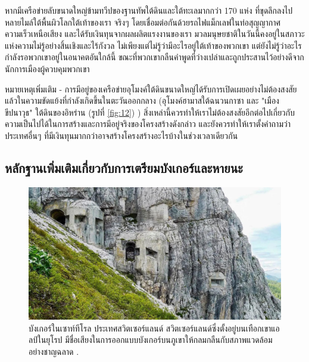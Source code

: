 \documentclass[10pt,twocolumn,letterpaper]{article}
\begin{document}
หากมีเครือข่ายลับขนาดใหญ่ข้ามทวีปของฐานทัพใต้ดินและใต้ทะเลมากกว่า 170 แห่ง ที่ขุดลึกลงไปหลายไมล์ใต้พื้นผิวโลกใต้เท้าของเรา จริงๆ โดยเชื่อมต่อกันด้วยรถไฟแม็กเลฟในท่อสุญญากาศความเร็วเหนือเสียง และได้รับเงินทุนจากผลผลิตแรงงานของเรา มวลมนุษยชาติในวันนี้คงอยู่ในสภาวะแห่งความไม่รู้อย่างสิ้นเชิงและไร้กังวล ไม่เพียงแต่ไม่รู้ว่ามีอะไรอยู่ใต้เท้าของพวกเขา แต่ยังไม่รู้ว่าอะไรกำลังรอพวกเขาอยู่ในอนาคตอันใกล้นี้ ขณะที่พวกเขากลืนคำพูดที่ว่างเปล่าและถูกประสานไว้อย่างดีจากนักการเมืองผู้ควบคุมพวกเขา

หมายเหตุเพิ่มเติม - การมีอยู่ของเครือข่ายอุโมงค์ใต้ดินขนาดใหญ่ได้รับการเปิดเผยอย่างไม่ต้องสงสัยแล้วในความขัดแย้งที่กำลังเกิดขึ้นในตะวันออกกลาง (อุโมงค์ฮามาสใต้ฉนวนกาซา \cite{38} และ "เมืองขีปนาวุธ" ใต้ดินของอิหร่าน (รูปที่ \ref{fig:12}) \cite{39,40}) สิ่งเหล่านี้ควรทำให้เราไม่ต้องสงสัยอีกต่อไปเกี่ยวกับความเป็นไปได้ในการสร้างและการมีอยู่จริงของโครงสร้างดังกล่าว และยังควรทำให้เราตั้งคำถามว่า ประเทศอื่นๆ ที่มีเงินทุนมากกว่าอาจสร้างโครงสร้างอะไรบ้างในช่วงเวลาเดียวกัน
\subsection{หลักฐานเพิ่มเติมเกี่ยวกับการเตรียมบังเกอร์และหายนะ}

\begin{figure}[t]
\begin{center}
   \includegraphics[width=1\linewidth]{tyrol.jpg}
\end{center}
   \caption{บังเกอร์ในเซาท์ทีโรล ประเทศสวิตเซอร์แลนด์ สวิตเซอร์แลนด์ซึ่งตั้งอยู่บนเทือกเขาแอลป์ในยุโรป มีชื่อเสียงในการออกแบบบังเกอร์บนภูเขาให้กลมกลืนกับสภาพแวดล้อมอย่างชาญฉลาด \cite{32}.}
\label{fig:7}
\label{fig:onecol}
\end{figure}
\end{document}

